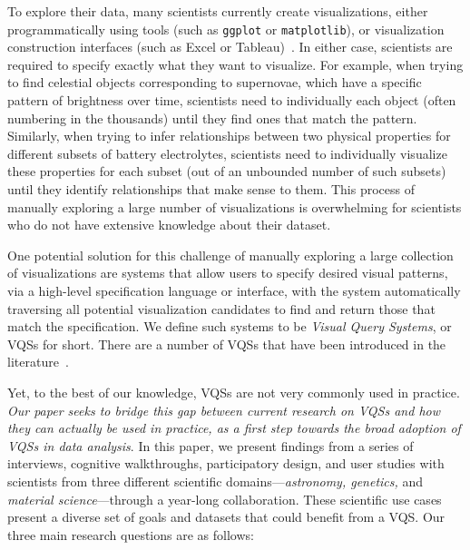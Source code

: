 To explore their data, many scientists currently
create visualizations, either programmatically using
tools (such as {\tt ggplot} or {\tt matplotlib}),
or visualization construction interfaces (such as
Excel or Tableau)~\cite{Momcheva2015,Prabhu2011}.
In either case, scientists are required to specify exactly what
they want to visualize. For example, when trying to find celestial objects
corresponding to supernovae, which have a specific pattern
of brightness over time, scientists
need to individually  each object (often numbering in the thousands) until they find ones that match the pattern. Similarly, when trying to infer relationships between two physical properties for different subsets of battery electrolytes, scientists need to individually visualize these properties
for each subset (out of an unbounded number of such subsets)
until they identify relationships that make sense to them. This process of manually exploring a large number of visualizations
is  overwhelming for scientists who do not have extensive knowledge about their
dataset.
\par One potential solution for this challenge of manually exploring a large collection of visualizations
are systems that allow users to specify
desired visual patterns, via a high-level specification language
or interface, with the system automatically
traversing all potential visualization candidates to find
and return those that match the specification.
We define such systems to be {\em Visual Query Systems}, or VQSs for short.
There are a number of VQSs that have been introduced in the literature~\cite{mohebbi2011google,Hochheiser2004,wattenberg2001sketching,Siddiqui2017VLDB,ryall2005querylines}.
\par {}
Yet, to the best of our knowledge,
VQSs are not very commonly used in practice.
{\em Our paper seeks to bridge this gap between current research on VQSs  and how they can actually be used in practice, as a first step towards the broad adoption of VQSs in data analysis}.
In this paper, we present findings from a series of interviews, cognitive walkthroughs, participatory design, and user studies with scientists from three different scientific
domains---{\em astronomy, genetics,} and {\em material science}---through a year-long collaboration.
These scientific use cases present a diverse set of goals and datasets that could benefit from a VQS. Our three main research questions are as follows:

